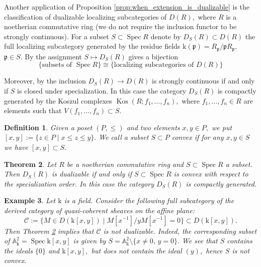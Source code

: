 \documentclass[11pt,leqno]{amsart}
\newtheorem{theo}{Theorem}[section]
\newtheorem{defi}[theo]{Definition}
\newtheorem{example}[theo]{Example}
\numberwithin{equation}{section}
\def\A{{\mathbb A}}
\def\Z{\mathbb{Z}}
\newcommand{\hy}{\mhyphen}
\newcommand{\Tate}{\operatorname{Tate}}
\newcommand{\mk}{\mathrm k}
\newcommand{\cC}{{\mathcal C}}
\newcommand{\Perf}{\operatorname{Perf}}
\newcommand{\Kos}{\operatorname{Kos}}
\newcommand{\Spec}{\operatorname{Spec}}
\newcommand{\tors}{\operatorname{tors}}
\newcommand{\mfp}{\mathfrak{p}}
\begin{document}


Another application of Proposition \ref{prop:when_extension_is_dualizable} is the classification of dualizable localizing subcategories of $D(R),$ where $R$ is a noetherian commutative ring (we do not require the inclusion functor to be strongly continuous). For a subset $S\subset\Spec R$ denote by
$D_S(R)\subset D(R)$ the full localizing subcategory generated by the residue fields $\mk(\mfp)=R_{\mfp}/\mfp R_{\mfp},$ $\mfp\in S.$  
By \cite[Theorem 2.8]{Nee92} the assignment $S\mapsto D_S(R)$ gives a bijection
$$\{\text{subsets of }\Spec R\}\cong \{\text{localizing subcategories of }D(R)\}$$

Moreover, by \cite[Theorem 3.3]{Nee92} the inclusion $D_S(R)\to D(R)$ is strongly continuous if and only if $S$ is closed under specialization. In this case the category $D_S(R)$ is compactly generated by the Koszul complexes $\Kos(R;f_1,\dots,f_n),$ where $f_1,\dots,f_n\in R$ are elements such that $V(f_1,\dots,f_n)\subset S.$

\begin{defi}Given a poset $(P,\leq)$ and two elements $x,y\in P,$ we put $[x,y]:=\{z\in P\mid x\leq z\leq y\}.$ We call a subset $S\subset P$ convex if for any $x,y\in S$ we have $[x,y]\subset S.$\end{defi}

\begin{theo}\label{th:dualizability_equiv_convexity} Let $R$ be a noetherian commutative ring and $S\subset\Spec R$ a subset. Then $D_S(R)$ is dualizable if and only if $S\subset\Spec R$ is convex with respect to the specialization order. In this case the category $D_S(R)$ is compactly generated.\end{theo}

\begin{example}Let $\mk$ is a field. Consider the following full subcategory of the derived category of quasi-coherent sheaves on the affine plane:
$$\cC:=\{M\in D(\mk[x,y])\mid M[x^{-1}]/y M[x^{-1}]=0\}\subset D(\mk[x,y]).$$ Then Theorem \ref{th:dualizability_equiv_convexity} implies that $\cC$ is not dualizable. Indeed, the corresponding subset of $\A_{\mk}^2=\Spec\mk[x,y]$ is given by $S=\A_{\mk}^2\setminus\{x\ne 0,\, y=0\}.$ We see that $S$ contains the ideals $\{0\}$ and $\mk[x,y],$ but does not contain the ideal $(y),$ hence $S$ is not convex.\end{example}
\end{document}
